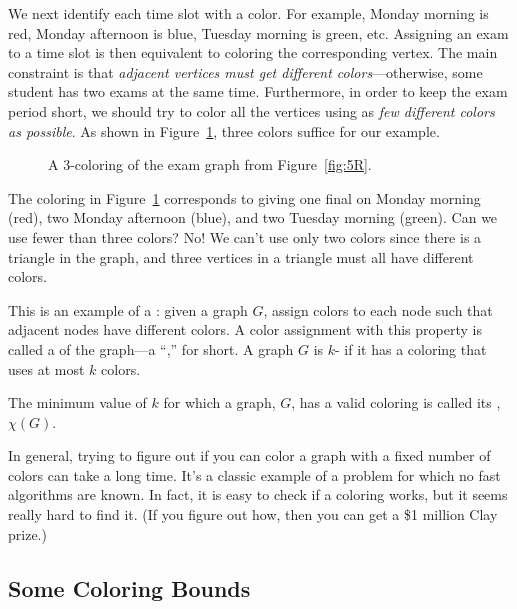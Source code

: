 We next identify each time slot with a color.  For example, Monday
morning is red, Monday afternoon is blue, Tuesday morning is green,
etc.  Assigning an exam to a time slot is then equivalent to coloring
the corresponding vertex.  The main constraint is that \emph{adjacent
  vertices must get different colors}---otherwise, some student has
two exams at the same time.  Furthermore, in order to keep the exam
period short, we should try to color all the vertices using as
\emph{few different colors as possible}.  As shown in Figure~\ref{fig:5S},
three colors suffice for our example.

\begin{figure}


\caption{A 3-coloring of the exam graph from Figure~\ref{fig:5R}.}

\label{fig:5S}

\end{figure}

The coloring in Figure~\ref{fig:5S} corresponds to giving one final on
Monday morning (red), two Monday afternoon (blue), and two Tuesday
morning (green).  Can we use fewer than three colors?  No! We can't
use only two colors since there is a triangle in the graph, and three
vertices in a triangle must all have different colors.

This is an example of a : given a graph
$G$, assign colors to each node such that adjacent nodes have
different colors.  A color assignment with this property is called a
 of the graph---a ``,'' for short.
A graph $G$ is $k$- if it has a coloring that uses at
most $k$ colors.
\begin{definition}
  The minimum value of $k$ for which a graph, $G$, has a valid coloring is
  called its , $\chi(G)$.
\end{definition}

In general, trying to figure out if you can color a graph with a fixed
number of colors can take a long time.  It's a classic example of a
problem for which no fast algorithms are known.  In fact, it is easy to
check if a coloring works, but it seems really hard to find it. (If you
figure out how, then you can get a \$1 million Clay prize.)


\subsection{Some Coloring Bounds}

